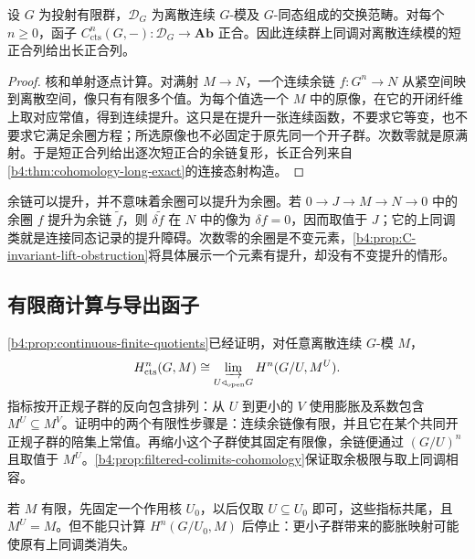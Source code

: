 \begin{proposition}\label{b4:prop:C-cochains-exact}
	设 \(G\) 为投射有限群，\(\mathcal D_G\) 为离散连续 \(G\)-模及 \(G\)-同态组成的交换范畴。对每个 \(n\ge0\)，函子 \(C^n_{\mathrm{cts}}(G,-):\mathcal D_G\rightarrow\mathbf{Ab}\) 正合。因此连续群上同调对离散连续模的短正合列给出长正合列。
\end{proposition}
\begin{proof}
	核和单射逐点计算。对满射 \(M\rightarrow N\)，一个连续余链 \(f:G^n\rightarrow N\) 从紧空间映到离散空间，像只有有限多个值。为每个值选一个 \(M\) 中的原像，在它的开闭纤维上取对应常值，得到连续提升。这只是在提升一张连续函数，不要求它等变，也不要求它满足余圈方程；所选原像也不必固定于原先同一个开子群。次数零就是原满射。于是短正合列给出逐次短正合的余链复形，长正合列来自\cref{b4:thm:cohomology-long-exact}的连接态射构造。
\end{proof}

余链可以提升，并不意味着余圈可以提升为余圈。若 \(0\to J\to M\to N\to0\) 中的余圈 \(f\) 提升为余链 \(\widetilde f\)，则 \(\delta\widetilde f\) 在 \(N\) 中的像为 \(\delta f=0\)，因而取值于 \(J\)；它的上同调类就是连接同态记录的提升障碍。次数零的余圈是不变元素，\cref{b4:prop:C-invariant-lift-obstruction}将具体展示一个元素有提升，却没有不变提升的情形。

\subsection{有限商计算与导出函子}
\label{b4:subsec:C01:03}

\cref{b4:prop:continuous-finite-quotients}已经证明，对任意离散连续 \(G\)-模 \(M\)，
\begin{equation}\label{b4:eq:C-finite-quotient-cohomology}
	H^n_{\mathrm{cts}}(G,M) \cong\varinjlim_{U\triangleleft_{\mathrm{open}}G}H^n(G/U,M^U).
\end{equation}
指标按开正规子群的反向包含排列：从 \(U\) 到更小的 \(V\) 使用膨胀及系数包含 \(M^U\subseteq M^V\)。证明中的两个有限性步骤是：连续余链像有限，并且它在某个共同开正规子群的陪集上常值。再缩小这个子群使其固定有限像，余链便通过 \((G/U)^n\) 且取值于 \(M^U\)。\cref{b4:prop:filtered-colimits-cohomology}保证取余极限与取上同调相容。

\ProseParagraphBreak
若 \(M\) 有限，先固定一个作用核 \(U_0\)，以后仅取 \(U\subseteq U_0\) 即可，这些指标共尾，且 \(M^U=M\)。但不能只计算 \(H^n(G/U_0,M)\) 后停止：更小子群带来的膨胀映射可能使原有上同调类消失。

